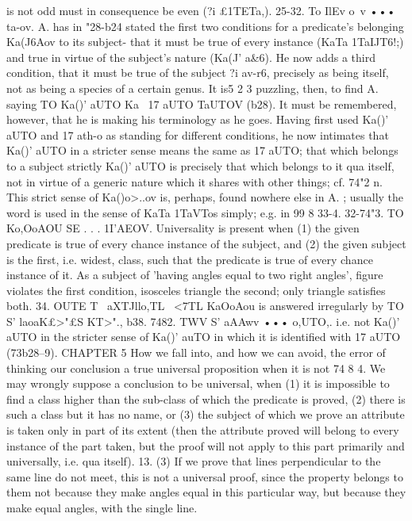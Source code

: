 {{{{{{is not odd must in consequence be even (?i £1TETa,).
25-32. To IlEv o~v ••• ta-ov. A. has in "28-b24 stated the first
two conditions for a predicate's belonging Ka(J6Aov to its subject-
that it must be true of every instance (KaTa 1TaIJT6!;) and true in
virtue of the subject's nature (Ka(J' a&6). He now adds a third
condition, that it must be true of the subject ?i av-r6, precisely
as being itself, not as being a species of a certain genus. It is5 2 3
puzzling, then, to find A. saying TO Ka()' aUTO Ka~ 17 aUTO TaUTOV
(b28). It must be remembered, however, that he is making his
terminology as he goes. Having first used Ka()' aUTO and 17 ath-o as
standing for different conditions, he now intimates that Ka()' aUTO
in a stricter sense means the same as 17 aUTO; that which belongs
to a subject strictly Ka()' aUTO is precisely that which belongs to
it qua itself, not in virtue of a generic nature which it shares
with other things; cf. 74"2 n.
This strict sense of Ka()o>..ov is, perhaps, found nowhere else
in A. ; usually the word is used in the sense of KaTa 1TaVTos simply;
e.g. in 99 8 33-4.
32-74"3. TO Ko,OoAOU SE . . . 1I'AEOV. Universality is present
when (1) the given predicate is true of every chance instance of
the subject, and (2) the given subject is the first, i.e. widest, class,
such that the predicate is true of every chance instance of it.
As a subject of 'having angles equal to two right angles', figure
violates the first condition, isosceles triangle the second; only
triangle satisfies both.
34. OUTE T~ aXTJllo,TL ~<7TL KaOoAou is answered irregularly by
TO S' laoaK£>"£S KT>"., b38.
7482. TWV S' aAAwv ••• o,UTO,. i.e. not Ka()' aUTO in the stricter
sense of Ka()' auTO in which it is identified with 17 aUTO (73b28--9).
CHAPTER 5
How we fall into, and how we can avoid, the error of thinking our
conclusion a true universal proposition when it is not
74 8 4. We may wrongly suppose a conclusion to be universal,
when (1) it is impossible to find a class higher than the sub-class
of which the predicate is proved, (2) there is such a class but it
has no name, or (3) the subject of which we prove an attribute
is taken only in part of its extent (then the attribute proved will
belong to every instance of the part taken, but the proof will not
apply to this part primarily and universally, i.e. qua itself).
13. (3) If we prove that lines perpendicular to the same line
do not meet, this is not a universal proof, since the property
belongs to them not because they make angles equal in this
particular way, but because they make equal angles, with the
single line.
}}}}}}
